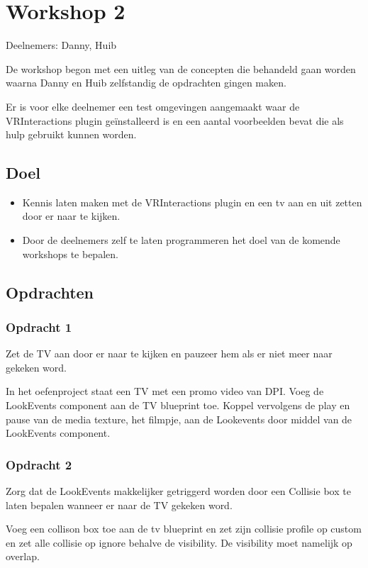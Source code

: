 
\chapter{Workshop 2}
\lhead{}
Deelnemers: Danny, Huib

De workshop begon met een uitleg van de concepten die behandeld gaan worden waarna Danny en Huib zelfstandig de opdrachten gingen maken.

Er is voor elke deelnemer een test omgevingen aangemaakt waar de VRInteractions plugin geïnstalleerd is en een aantal voorbeelden bevat die als hulp gebruikt kunnen worden.

\section{Doel}
\begin{itemize}
	\item Kennis laten maken met de VRInteractions plugin en een tv aan en uit zetten door er naar te kijken.
	\item Door de deelnemers zelf te laten programmeren het doel van de komende workshops te bepalen. 
\end{itemize}

\section{Opdrachten}

\subsection{Opdracht 1}
Zet de TV aan door er naar te kijken en pauzeer hem als er niet meer naar gekeken word.

In het oefenproject staat een TV met een promo video van DPI. 
Voeg de LookEvents component aan de TV blueprint toe.
Koppel vervolgens de play en pause van de media texture, het filmpje, aan de Lookevents door middel van de LookEvents component.

\subsection{Opdracht 2}
Zorg dat de LookEvents makkelijker getriggerd worden door een Collisie box te laten bepalen wanneer er naar de TV gekeken word.

Voeg een collison box toe aan de tv blueprint en zet zijn collisie profile op custom en zet alle collisie op ignore behalve de visibility. De visibility moet namelijk op overlap.

